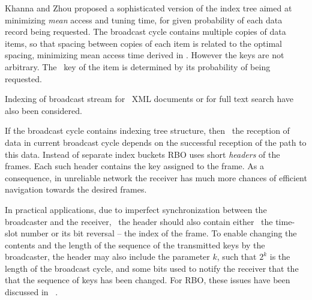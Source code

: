\documentclass{article}
\newcommand{\tmem}[1]{{\em #1\/}}
\begin{document}
Khanna and Zhou {\cite{Khanna2000575}} proposed a sophisticated version of
the index tree aimed at minimizing {\tmem{mean}} access and tuning time, for
given probability of each data record being requested. The broadcast cycle
contains multiple copies of data items, so that spacing between copies of each
item is related to the optimal spacing, minimizing mean access time derived in
{\cite{DBLP:journals/winet/VaidyaH99}}. However the keys are not arbitrary.
The \ key of the item is determined by its probability of being requested. \

Indexing of broadcast stream for \ XML documents
{\cite{DBLP:journals/isci/ChungL07}} or for full text search
{\cite{DBLP:journals/tkde/ChungYK10}} have also been considered.

If the broadcast cycle contains indexing tree structure, then \ the reception
of data in current broadcast cycle depends on the successful reception of the
path to this data. Instead of separate index buckets RBO uses short
{\tmem{headers}} of the frames. Each such header contains the key assigned to
the frame. As a consequence, in unreliable network the receiver has much more
chances of efficient navigation towards the desired frames.

In practical applications, due to imperfect synchronization between the
broadcaster and the receiver, \ the header should also contain either \ the
time-slot number or its bit reversal -- the index of the frame. To enable
changing the contents and the length of the sequence of the transmitted keys
by the broadcaster, the header may also include the parameter $k$, such that
$2^k$ is the length of the broadcast cycle, and some bits used to notify the
receiver that the that the sequence of keys has been changed. For RBO, these
issues have been discussed in \ {\cite{DBLP:journals/corr/abs-1108-5095}}.
\end{document}
